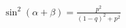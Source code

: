 \documentclass[preview]{standalone}
\begin{document}
\begin{align*}
\sin^2(\alpha + \beta) = \frac{p^2}{(1-q)^2 + p^2}
\end{align*}
\end{document}
